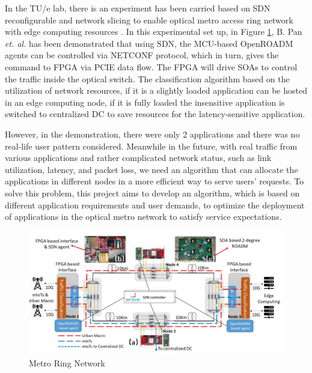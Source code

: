 \documentclass[conference]{IEEEtran}
\begin{document}
In the TU/e lab, there is an experiment has been carried based on SDN reconfigurable and network slicing to enable optical metro access ring network with edge computing resources \cite{8818041}. In this experimental set up, in Figure \ref{fig:metro_ring}, B. Pan \textit{et. al.} has been demonstrated that using SDN, the MCU-based OpenROADM agents can be controlled via NETCONF protocol, which in turn, gives the command to FPGA via PCIE data flow. The FPGA will drive SOAs to control the traffic inside the optical switch. The classification algorithm based on the utilization of network resources, if it is a slightly loaded application can be hosted in an edge computing node, if it is fully loaded the insensitive application is switched to centralized DC to save resources for the latency-sensitive application.

However, in the demonstration, there were only 2 applications and there was no real-life user pattern considered. Meanwhile in the future, with real traffic from various applications and rather complicated network status, such as link utilization, latency, and packet loss, we need an algorithm that can allocate the applications in different nodes in a more efficient way to serve users' requests. To solve this problem, this project aims to develop an algorithm, which is based on different application requirements and user demands, to optimize the deployment of applications in the optical metro network to satisfy service expectations.


\begin{figure}[hbtp]
\centering
\includegraphics[scale = 0.4]{imgs/ring_metro_network.png}
\caption{Metro Ring Network}
\label{fig:metro_ring}
\end{figure}

\end{document}
